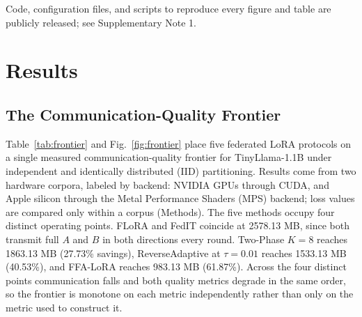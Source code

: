 \documentclass[pdflatex,sn-nature,lineno]{sn-jnl}
\begin{document}
Code, configuration files, and scripts to reproduce every figure and table are publicly released; see Supplementary Note 1.

\section{Results}
\label{sec:experiments}

\subsection{The Communication-Quality Frontier}
\label{sec:frontier}
Table~\ref{tab:frontier} and Fig.~\ref{fig:frontier} place five federated LoRA protocols on a single measured communication-quality frontier for TinyLlama-1.1B \cite{zhang2024tinyllama} under independent and identically distributed (IID) partitioning. Results come from two hardware corpora, labeled by backend: NVIDIA GPUs through CUDA, and Apple silicon through the Metal Performance Shaders (MPS) backend; loss values are compared only within a corpus (Methods). The five methods occupy four distinct operating points. FLoRA \cite{wang2024flora} and FedIT \cite{zhang2024federatedgpt} coincide at 2578.13 MB, since both transmit full $A$ and $B$ in both directions every round. Two-Phase $K{=}8$ reaches 1863.13 MB (27.73\% savings), ReverseAdaptive at $\tau{=}0.01$ reaches 1533.13 MB (40.53\%), and FFA-LoRA \cite{sun2024ffalora} reaches 983.13 MB (61.87\%). Across the four distinct points communication falls and both quality metrics degrade in the same order, so the frontier is monotone on each metric independently rather than only on the metric used to construct it.
\end{document}
